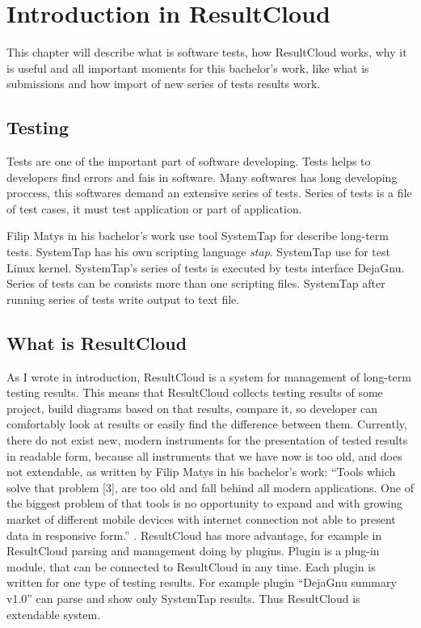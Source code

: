 \chapter{Introduction in ResultCloud}
\label{ch:resultcloud}

This chapter will describe what is software tests, how ResultCloud works, why it is useful and all important moments for this bachelor's work, like what is submissions and how import of new series of tests results work.

\section{Testing}

Tests are one of the important part of software developing. Tests helps to developers find errors and fais in software. Many softwares has long developing proccess, this softwares demand an extensive series of tests. Series of tests is a file of test cases, it must test application or part of application.

Filip Matys in his bachelor's work use tool SystemTap for describe long-term tests. SystemTap has his own scripting language \emph{stap}. SystemTap use for test Linux kernel. SystemTap's series of tests is executed by tests interface DejaGnu. Series of tests can be consists more than one scripting files. SystemTap after running series of tests write output to text file.  

\section{What is ResultCloud}

As I wrote in introduction, ResultCloud is a system for management of long-term testing results. This means that ResultCloud collects testing results of some project, build diagrams based on that results, compare it, so developer can comfortably look at results or easily find the difference between them. Currently, there do not exist new, modern instruments for the presentation of tested results in readable form, because all instruments that we have now is too old, and does not extendable, as written by Filip Matys in his bachelor's work: “Tools which solve that problem [3], are too old and fall behind all modern applications. One of the biggest problem of that tools is no opportunity to expand and with growing market of different mobile devices with internet connection not able to present data in responsive form.” \cite{filip}. ResultCloud has more advantage, for example in ResultCloud parsing and management doing by plugins. Plugin is a plug-in module, that can be connected to ResultCloud in any time. Each plugin is written for one type of testing results. For example plugin “DejaGnu summary v1.0” can parse and show only SystemTap results. Thus ResultCloud is extendable system.

